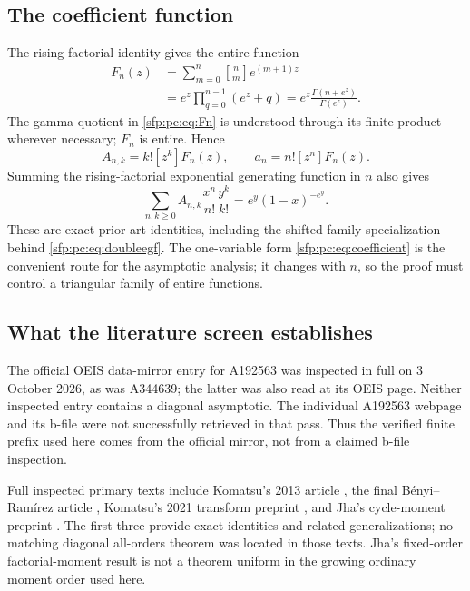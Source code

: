 \documentclass[11pt,letterpaper]{article}
\numberwithin{equation}{section}
\theoremstyle{definition}\newtheorem{definition}[theorem]{Definition}
\theoremstyle{remark}\newtheorem{remark}[theorem]{Remark}
\newcommand{\sone}[2]{\genfrac{[}{]}{0pt}{}{#1}{#2}}
\begin{document}
\subsection{The coefficient function}

The rising-factorial identity gives the entire function
\begin{align}
 F_n(z)&=\sum_{m=0}^n\sone nm e^{(m+1)z}\label{sfp:pc:eq:positive}\\
       &=e^z\prod_{q=0}^{n-1}(e^z+q)
        =e^z\frac{\Gamma(n+e^z)}{\Gamma(e^z)}.
        \label{sfp:pc:eq:Fn}
\end{align}
The gamma quotient in \eqref{sfp:pc:eq:Fn} is understood through its
finite product wherever necessary; $F_n$ is entire. Hence
\begin{equation}\label{sfp:pc:eq:coefficient}
 A_{n,k}=k![z^k]F_n(z),\qquad a_n=n![z^n]F_n(z).
\end{equation}
Summing the rising-factorial exponential generating function in
$n$ also gives
\begin{equation}\label{sfp:pc:eq:doubleegf}
 \sum_{n,k\geq0}A_{n,k}\frac{x^n}{n!}\frac{y^k}{k!}
     =e^y(1-x)^{-e^y}.
\end{equation}
These are exact prior-art identities, including the shifted-family
specialization behind \eqref{sfp:pc:eq:doubleegf}. The one-variable form
\eqref{sfp:pc:eq:coefficient} is the convenient route for the asymptotic
analysis; it changes with $n$, so the proof must control a triangular
family of entire functions.

\subsection{What the literature screen establishes}\label{sfp:pc:sub:screen}

The official OEIS data-mirror entry for A192563 was inspected in
full on 3 October 2026, as was A344639; the latter was also read at
its OEIS page. Neither inspected entry contains a diagonal asymptotic.
The individual A192563 webpage and its b-file were not successfully
retrieved in that pass. Thus the verified finite prefix used here
comes from the official mirror, not from a claimed b-file inspection.

Full inspected primary texts include Komatsu's 2013 article
\cite{komatsu2013}, the final B\'enyi--Ram\'irez article
\cite{benyi}, Komatsu's 2021 transform preprint
\cite{transform}, and Jha's cycle-moment preprint \cite{jha}.
The first three provide exact identities and related generalizations;
no matching diagonal all-orders theorem was located in those texts.
Jha's fixed-order factorial-moment result is not a theorem uniform in
the growing ordinary moment order used here.
\end{document}
